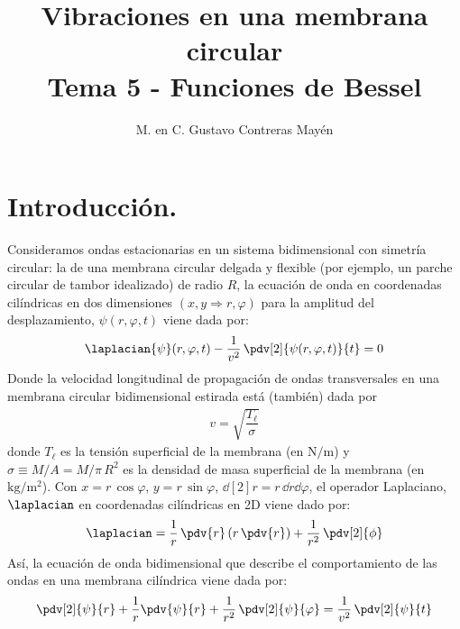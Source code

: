 
\usepackage{apacite}
\title{Vibraciones en una membrana circular \\ \large {Tema 5 - Funciones de Bessel} \vspace{-3ex}}
\author{M. en C. Gustavo Contreras Mayén}
\date{ }

\vspace{-4cm}
\maketitle
\fontsize{14}{14}\selectfont
\tableofcontents
\newpage
\section{Introducción.}
Consideramos ondas estacionarias en un sistema bidimensional con simetría circular: la de una membrana circular delgada y flexible (por ejemplo, un parche circular de tambor idealizado) de radio $R$, la ecuación de onda en coordenadas cilíndricas en dos dimensiones $(x , y \Rightarrow r, \varphi)$ para la amplitud del desplazamiento, $\psi (r, \varphi, t)$ viene dada por:
\begin{align*}
\laplacian{\psi} (r, \varphi, t) - \dfrac{1}{v^{2}} \, \pdv[2]{\psi (r, \varphi, t)}{t} = 0
\end{align*}
Donde la velocidad longitudinal de propagación de ondas transversales en una membrana circular bidimensional estirada está (también) dada por 
\begin{align*}
v = \sqrt{\dfrac{T_{\ell}}{\sigma}}
\end{align*}
donde $T_{\ell}$ es la tensión superficial de la membrana (en $\si{\newton\per\metre}$) y $\sigma \equiv M/A = M / \pi \, R^{2}$ es la densidad de masa superficial de la membrana (en $\si{\kilo\gram\per\square\metre}$). Con $x = r \, \cos \varphi$, $y = r \, \sin \varphi$, $\dd[2]{r} = r \, \dd{r} \dd{\varphi}$, el operador Laplaciano, $\laplacian$ en coordenadas cilíndricas en 2D viene dado por:
\begin{align*}
\laplacian = \dfrac{1}{r} \, \pdv{r} \left( r \, \pdv{r} \right) + \dfrac{1}{r^{2}} \, \pdv[2]{\phi}
\end{align*}
Así, la ecuación de onda bidimensional que describe el comportamiento de las ondas en una membrana cilíndrica viene dada por:
\begin{align*}
\pdv[2]{\psi}{r} + \dfrac{1}{r} \pdv{\psi}{r} + \dfrac{1}{r^{2}} \, \pdv[2]{\psi}{\varphi} = \dfrac{1}{v^{2}} \, \pdv[2]{\psi}{t}
\end{align*}
